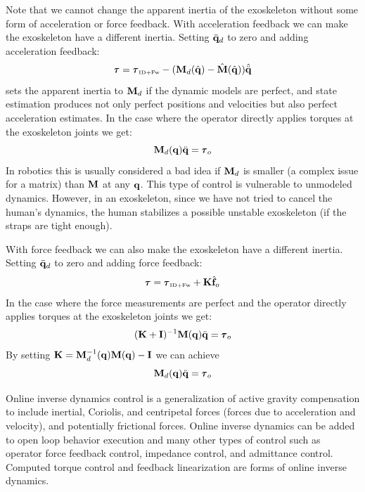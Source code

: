 \documentclass[letterpaper,12pt,fullpage]{article}
\newcommand{\invdynw}{{\mbox {\tiny ID+Fw}}}
\begin{document}
Note that we cannot change the apparent inertia of the exoskeleton without
some form of acceleration or force feedback.
With acceleration feedback we can make the exoskeleton have a different inertia.
Setting $\ddot{{\bf q}}_d$ to zero and adding acceleration feedback:
\begin{equation}
\vtau = \vtau_{\invdynw} - (\mM_d(\hat{\vq}) - \hat{\mM}(\hat{\vq})) \hat{\ddot{\vq}}
\label{eq:change-inertia1}
\end{equation}
sets the apparent inertia to ${\bf M}_d$ if the dynamic models are perfect, and
state estimation produces not only perfect positions and velocities but
also perfect acceleration estimates. In the case 
where the operator directly applies torques at the
exoskeleton joints we get:
\begin{equation}
\mM_d (\vq) \ddot{\vq} = \vtau_o
\end{equation}
In robotics this is usually considered a bad idea if ${\bf M}_d$ is smaller (a complex
issue for a matrix) than ${\bf M}$ at any ${\bf q}$. This type of control is vulnerable
to unmodeled dynamics. However, in an exoskeleton, since we have not tried to
cancel the human's dynamics, the human stabilizes a possible unstable exoskeleton
(if the straps are tight enough).

With force feedback we can also make the exoskeleton have a different inertia.
Setting $\ddot{{\bf q}}_d$ to zero and adding force feedback:
\begin{equation}
\vtau = \vtau_{\invdynw} + \mK \hat{\vf}_o
\end{equation}
In the case where the force measurements are perfect and 
the operator directly applies torques at the
exoskeleton joints we get:
\begin{equation}
(\mK + \mI)^{-1} \mM (\vq) \ddot{\vq} = \vtau_o
\end{equation}
By setting ${\bf K} = {\bf M}^{-1}_d ({\bf q}) {\bf M} ({\bf q}) - {\bf I}$ we can achieve
\begin{equation}
\mM_d (\vq) \ddot{\vq} = \vtau_o
\end{equation}

Online inverse dynamics control is a generalization of 
active gravity compensation to include
inertial, Coriolis, and centripetal forces (forces due to acceleration and
velocity), and potentially frictional forces.
Online inverse dynamics can be added to open loop behavior execution
and many other types of control such as operator force
feedback control, impedance control, and admittance control.
Computed torque control and feedback linearization are forms of online
inverse dynamics.
\end{document}
